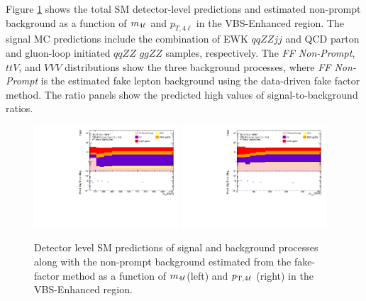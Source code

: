 Figure \ref{fig:MCFFRedStack} shows the total SM detector-level predictions and estimated non-prompt background as a function of $m_{4\ell}$ and $p_{T,4\ell}$ in the VBS-Enhanced region. The signal MC predictions include the combination of EWK $qqZZjj$ and QCD parton and gluon-loop initiated $qqZZ$ $ggZZ$ samples, respectively. The \textit{FF Non-Prompt}, $ttV$, and $VVV$ distributions show the three background processes, where  \textit{FF Non-Prompt} is the estimated fake lepton background using the data-driven fake factor method. The ratio panels show the predicted high values of signal-to-background ratios. 

\begin{figure}[!htb]
    \centering
    \includegraphics[width=0.48\textwidth]{figures/Analysis/Background/RedStack_VBSEnhanced_M4l.pdf}
    \includegraphics[width=0.48\textwidth]{figures/Analysis/Background/RedStack_VBSEnhanced_Pt4l.pdf}
    \caption{ Detector level SM predictions of signal and background processes along with the non-prompt background estimated from the fake-factor method as a function of $m_{4\ell}$(left) and $p_{\textrm{T} ,4\ell}$ (right) in the VBS-Enhanced region. \label{fig:MCFFRedStack} }
\end{figure}